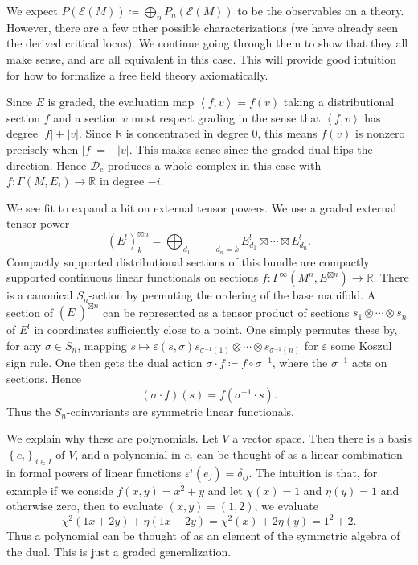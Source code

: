 \begin{example}
We expect $P(\mathcal{E} (M)) \coloneqq \bigoplus_{n} P_n(\mathcal{E} (M))$ to be the observables on a theory. However, there are a few other possible characterizations (we have already seen the derived critical locus). We continue going through them to show that they all make sense, and are all equivalent in this case. This will provide good intuition for how to formalize a free field theory axiomatically.

Since $E$ is graded, the evaluation map $\left\langle f,v \right\rangle=f(v) $ taking a distributional section $f$ and a section $v$ must respect grading in the sense that $\left\langle f,v \right\rangle $ has degree $\left| f \right| +\left| v \right| $. Since $\mathbb{R} $ is concentrated in degree 0, this means $f(v)$ is nonzero precisely when $\left| f \right| =-\left| v \right| $. This makes sense since the graded dual flips the direction. Hence $\mathcal{D} _c$ produces a whole complex in this case with $f : \Gamma (M,E_i) \to \mathbb{R} $ in degree $-i$.


We see fit to expand a bit on external tensor powers. We use a graded external tensor power
\[
	(E^!)^{\boxtimes n}_k = \bigoplus_{d_1+ \cdots + d_n=k} E^!_{d_1} \boxtimes \cdots \boxtimes E^!_{d_n} 
.\]
Compactly supported distributional sections of this bundle are compactly supported continuous linear functionals on sections $f : \Gamma ^\infty (M^n, E^{\boxtimes n} ) \to \mathbb{R} $. There is a canonical $S_n$-action by permuting the ordering of the base manifold. A section of $(E^!)^{\boxtimes n} $ can be represented as a tensor product of sections $s_1 \otimes \cdots \otimes s_n$ of $E^!$ in coordinates sufficiently close to a point. One simply permutes these by, for any $\sigma \in S_n$, mapping $s\mapsto \varepsilon (s,\sigma )s_{\sigma^{-1} (1)} \otimes \cdots \otimes s_{\sigma ^{-1} (n)} $ for $\varepsilon $ some Koszul sign rule. One then gets the dual action $\sigma \cdot f \coloneqq f\circ \sigma ^{-1} $, where the $\sigma ^{-1} $ acts on sections. Hence
\[
	(\sigma \cdot f)(s) = f(\sigma^{-1}  \cdot s)
.\]
Thus the $S_n$-coinvariants are symmetric linear functionals.

We explain why these are polynomials. Let $V$ a vector space. Then there is a basis $\left\{ e_i \right\} _{i\in I} $ of $V$, and a polynomial in $e_i$ can be thought of as a linear combination in formal powers of linear functions $\varepsilon^i(e_j)=\delta _{ij} $. The intuition is that, for example if we conside $f(x,y)=x^2+y$ and let $\chi (x)=1$ and $\eta (y)=1$ and otherwise zero, then to evaluate $(x,y)=(1,2)$, we evaluate
\[
	\chi ^2(1x+2y) + \eta (1x+2y) = \chi ^2(x) + 2\eta (y) = 1^2 + 2
.\]
Thus a polynomial can be thought of as an element of the symmetric algebra of the dual. This is just a graded generalization.


\end{example}
